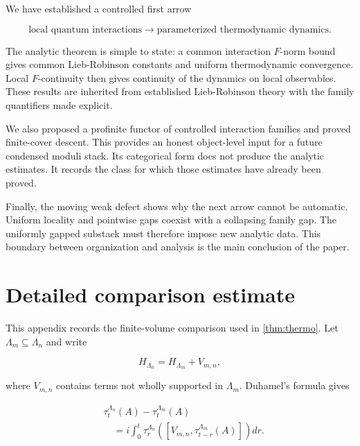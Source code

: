 \documentclass[12pt]{article}
\theoremstyle{definition}
\theoremstyle{remark}
\begin{document}
We have established a controlled first arrow

\begin{equation}
  \text{local quantum interactions}
  \longrightarrow
  \text{parameterized thermodynamic dynamics}.
\end{equation}

The analytic theorem is simple to state: a common interaction $F$-norm bound
gives common Lieb-Robinson constants and uniform thermodynamic convergence.
Local $F$-continuity then gives continuity of the dynamics on local
observables.  These results are inherited from established Lieb-Robinson
theory with the family quantifiers made explicit.

We also proposed a profinite functor of controlled interaction families and
proved finite-cover descent.  This provides an honest object-level input for
a future condensed moduli stack.  Its categorical form does not produce the
analytic estimates.  It records the class for which those estimates have
already been proved.

Finally, the moving weak defect shows why the next arrow cannot be automatic.
Uniform locality and pointwise gaps coexist with a collapsing family gap.
The uniformly gapped substack must therefore impose new analytic data.  This
boundary between organization and analysis is the main conclusion of the
paper.

\appendix

\section{Detailed comparison estimate}

This appendix records the finite-volume comparison used in
\cref{thm:thermo}.  Let $\Lambda_m\subseteq\Lambda_n$ and write

\begin{equation}
  H_{\Lambda_n}=H_{\Lambda_m}+V_{m,n},
\end{equation}

where $V_{m,n}$ contains terms not wholly supported in $\Lambda_m$.  Duhamel's
formula gives

\begin{equation}
\begin{split}
 &\tau_t^{\Lambda_n}(A)-\tau_t^{\Lambda_m}(A)\\
 &\quad=
 i\int_0^t
 \tau_r^{\Lambda_n}
 \left([V_{m,n},\tau_{t-r}^{\Lambda_m}(A)]\right)dr.
 \label{eq:duhamel}
\end{split}
\end{equation}
\end{document}
